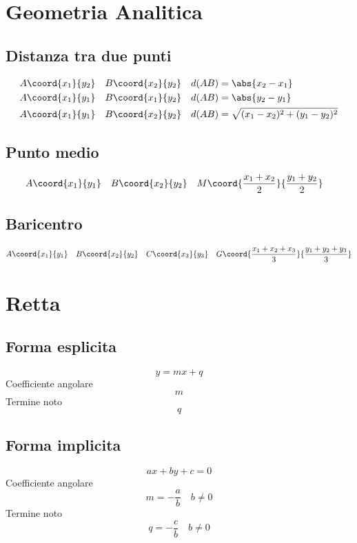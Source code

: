 \chapter{Geometria Analitica}
\section{Distanza tra due punti}
\begin{align*}
A\coord{x_1}{y_2}&& B\coord{x_2}{y_2}&&&  d(AB)=\abs{x_2-x_1}\\
A\coord{x_1}{y_1} && B\coord{x_1}{y_2}&&&  d(AB)=\abs{y_2-y_1}\\
A\coord{x_1}{y_1} && B\coord{x_2}{y_2}&&&  d(AB)=\sqrt{(x_1-x_2)^2+(y_1-y_2)^2}
\end{align*}
\section{Punto medio}
\begin{align*}
A\coord{x_1}{y_1}&& B\coord{x_2}{y_2}&&& M\coord{\dfrac{x_1+x_2}{2}}{\dfrac{y_1+y_2}{2}}
\end{align*}
\section{Baricentro}
\begin{align*}
A\coord{x_1}{y_1}& &B\coord{x_2}{y_2}&&C\coord{x_3}{y_3}&& G\coord{\dfrac{x_1+x_2+x_3}{3}}{\dfrac{y_1+y_2+y_3}{3}}
\end{align*}
\chapter{Retta}
\section{Forma esplicita}
\begin{equation*}
y=mx+q
\end{equation*}
Coefficiente angolare
\begin{equation*}
m
\end{equation*}
Termine noto
\begin{equation*}
q
\end{equation*}
\section{Forma implicita}
\begin{equation*}
ax+by+c=0
\end{equation*}
Coefficiente angolare
\begin{equation*}
m=-\dfrac{a}{b}\quad b\neq 0
\end{equation*}
Termine noto
\begin{equation*}
q=-\dfrac{c}{b}\quad b\neq 0
\end{equation*}
